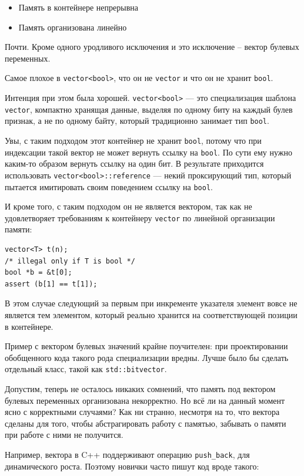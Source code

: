 \documentclass[a4paper,12pt,oneside]{article}
\begin{document}
\begin{itemize}
\item Память в контейнере непрерывна
\item Память организована линейно
\end{itemize}

Почти. Кроме одного уродливого исключения и это исключение -- вектор булевых переменных.

Самое плохое в \lstinline!vector<bool>!, что он не \lstinline!vector! и что он не хранит \lstinline!bool!.

Интенция при этом была хорошей. \lstinline!vector<bool>! — это специализация шаблона \lstinline!vector!, компактно хранящая данные, выделяя по одному биту на каждый булев признак, а не по одному байту, который традиционно занимает тип \lstinline!bool!.

Увы, с таким подходом этот контейнер не хранит \lstinline!bool!, потому что при индексации такой вектор не может вернуть ссылку на \lstinline!bool!. По сути ему нужно каким-то образом вернуть ссылку на один бит. В результате приходится использовать \lstinline!vector<bool>::reference! — некий проксирующий тип, который пытается имитировать своим поведением ссылку на \lstinline!bool!.

И кроме того, с таким подходом он не является вектором, так как не удовлетворяет требованиям к контейнеру \lstinline!vector! по линейной организации памяти:

\begin{lstlisting}
vector<T> t(n);
/* illegal only if T is bool */
bool *b = &t[0];
assert (b[1] == t[1]);
\end{lstlisting}

В этом случае следующий за первым при инкременте указателя элемент вовсе не является тем элементом, который реально хранится на соответствующей позиции в контейнере.

Пример с вектором булевых значений крайне поучителен: при проектировании обобщенного кода такого рода специализации вредны. Лучше было бы сделать отдельный класс, такой как \lstinline!std::bitvector!.

Допустим, теперь не осталось никаких сомнений, что память под вектором булевых переменных организована некорректно. Но всё ли на данный момент ясно с корректными случаями? Как ни странно, несмотря на то, что вектора сделаны для того, чтобы абстрагировать работу с памятью, забывать о памяти при работе с ними не получится.

Например, вектора в C++ поддерживают операцию \lstinline!push_back!, для динамического роста. Поэтому новички часто пишут код вроде такого:
\end{document}

